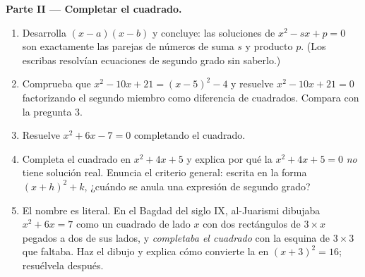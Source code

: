 \begin{problem}[{Problema de fin de semana --- problemas de suma y
producto, completar el cuadrado tal como lo dibujaba al-Juarismi y la
ecuación $x^2 = x + 1$}]
\medskip
\noindent\textbf{Parte II --- Completar el cuadrado.}
\begin{enumerate}[resume]
  \item Desarrolla $(x - a)(x - b)$ y concluye: las soluciones de
        $x^2 - sx + p = 0$ son exactamente las parejas de números de suma
        $s$ y producto $p$. (Los escribas resolvían ecuaciones de segundo
        grado sin saberlo.)
  \item Comprueba que $x^2 - 10x + 21 = (x - 5)^2 - 4$ y resuelve
        $x^2 - 10x + 21 = 0$ factorizando el segundo miembro como
        diferencia de cuadrados. Compara con la pregunta 3.
  \item Resuelve $x^2 + 6x - 7 = 0$ completando el cuadrado.
  \item Completa el cuadrado en $x^2 + 4x + 5$ y explica por qué la
         $x^2 + 4x + 5 = 0$ \emph{no} tiene solución real. Enuncia
        el criterio general: escrita en la forma $(x + h)^2 + k$, ¿cuándo
        se anula una expresión de segundo grado?
  \item El nombre es literal. En el Bagdad del siglo IX, al-Juarismi
        dibujaba $x^2 + 6x = 7$ como un cuadrado de lado $x$ con dos
        rectángulos de $3 \times x$ pegados a dos de sus lados, y
        \emph{completaba el cuadrado} con la esquina de $3 \times 3$ que
        faltaba. Haz el dibujo y explica cómo convierte la  en
        $(x + 3)^2 = 16$; resuélvela después.
\end{enumerate}


\end{problem}
